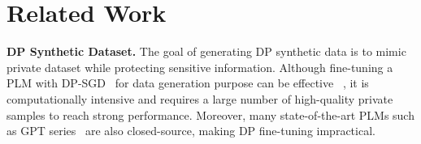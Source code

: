 \section{Related Work}

\textbf{DP Synthetic Dataset.} 
The goal of generating DP synthetic data is to mimic private dataset while protecting sensitive information. %
Although fine-tuning a PLM with DP-SGD~\cite{abadi2016deep} for data generation purpose can be effective%
~\cite{bommasani2019towards,putta2023differentially,flemings2024differentially,mattern2022differentially,yue2023synthetic}, it 
is computationally intensive and requires a large number of high-quality private samples to reach strong performance.
Moreover, many state-of-the-art PLMs such as GPT series~\cite{openai2021gpt3-5,openai2023gpt4,hurst2024gpt4o} are also closed-source, making DP fine-tuning impractical.

